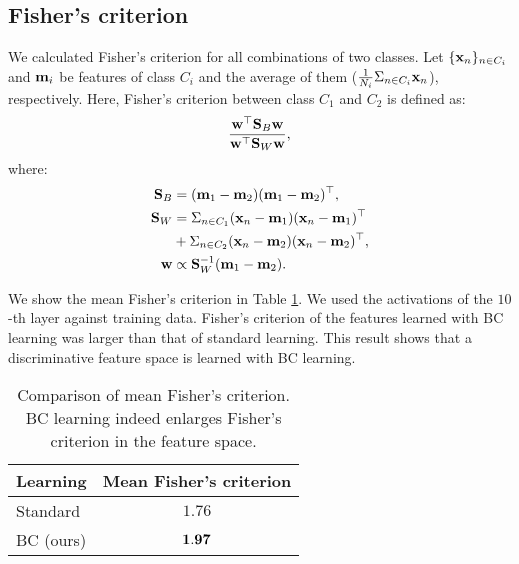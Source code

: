 \documentclass[10pt,twocolumn,letterpaper]{article}
\begin{document}
\subsection{Fisher's criterion}
We calculated Fisher's criterion \cite{fisher1936use} for all combinations of two classes. Let $\{ {\bf x}_n\}_{n \in C_i}$ and ${\bf m}_i$ be features of class $C_i$ and the average of them ($\frac{1}{N_i} \Sigma_{n\in C_i}{{\bf x}_n}$), respectively. Here, Fisher's criterion between class $C_1$ and $C_2$ is defined as:
\begin{equation}
  \frac{{\bf w}^{\top} {\bf S}_B {\bf w}} {{\bf w}^{\top} {\bf S}_W {\bf w}},
  \vspace{-1mm}
\end{equation}
where:
\vspace{-1mm}
\begin{equation}
\begin{split}
  {\bf S}_B &= ({\bf m}_1 - {\bf m}_2)({\bf m}_1 - {\bf m}_2)^{\top}, \\
  {\bf S}_W &= \Sigma_{n \in C_1}{({\bf x}_n - {\bf m}_1)({\bf x}_n - {\bf m}_1)^{\top}} \\
  &+ \Sigma_{n \in C_2}{({\bf x}_n - {\bf m}_2)({\bf x}_n - {\bf m}_2)^{\top}}, \\
  {\bf w} &\propto {\bf S}_W^{-1}({\bf m}_1 - {\bf m}_2).
\end{split}
\vspace{-4mm}
\end{equation}

We show the mean Fisher's criterion in Table \ref{tab:fisher}. We used the activations of the $10$-th layer against training data. Fisher's criterion of the features learned with BC learning was larger than that of standard learning. This result shows that a discriminative feature space is learned with BC learning. 

\begin{table}[h]
	\centering
	\caption{Comparison of mean Fisher's criterion. BC learning indeed enlarges Fisher's criterion in the feature space.}
	\label{tab:fisher}
	\vspace{2mm}
	\small
	\begin{tabular}{lc}
		\toprule
		Learning & Mean Fisher's criterion \\
		\midrule
		Standard & $1.76$ \\
		BC (ours) & ${\bf 1.97}$ \\
		\bottomrule
	\end{tabular}
	\vspace{-2mm}
\end{table}
\end{document}
